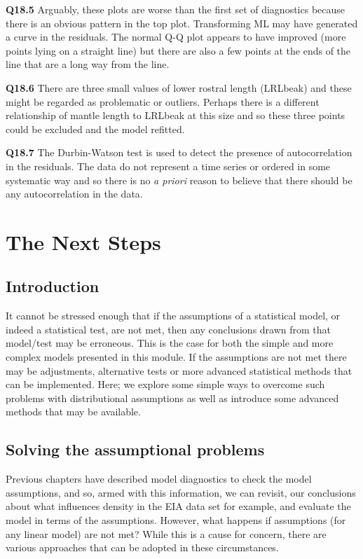 \documentclass[
  oneside]{krantz}
\begin{document}
\textbf{Q18.5} Arguably, these plots are worse than the first set of diagnostics because there
is an obvious pattern in the top plot. Transforming ML may have generated a curve
in the residuals. The normal Q-Q plot appears to have improved (more points lying
on a straight line) but there are also a few points at the ends of the line that
are a long way from the line.

\textbf{Q18.6} There are three small values of lower rostral length (LRLbeak) and these might
be regarded as problematic or outliers. Perhaps there is a different relationship
of mantle length to LRLbeak at this size and so these three points could be
excluded and the model refitted.

\textbf{Q18.7} The Durbin-Watson test is used to detect the presence of autocorrelation in the
residuals. The data do not represent a time series or ordered in some systematic
way and so there is no \emph{a priori} reason to believe that there should be
any autocorrelation in the data.

\hypertarget{nextsteps}{%
\chapter{The Next Steps}\label{nextsteps}}

\hypertarget{INTnext}{%
\section{Introduction}\label{INTnext}}

It cannot be stressed enough that if the assumptions of a statistical model, or indeed a statistical test, are not met, then any conclusions drawn from that model/test may be erroneous. This is the case for both the simple and more complex models presented in this module. If the assumptions are not met there may be adjustments, alternative tests or more advanced statistical methods that can be implemented. Here; we explore some simple ways to overcome such problems with distributional assumptions as well as introduce some advanced methods that may be available.

\hypertarget{solving-the-assumptional-problems}{%
\section{Solving the assumptional problems}\label{solving-the-assumptional-problems}}

Previous chapters have described model diagnostics to check the model assumptions, and so, armed with this information, we can revisit, our conclusions about what influences density in the EIA data set for example, and evaluate the model in terms of the assumptions. However, what happens if assumptions (for any linear model) are not met? While this is a cause for concern, there are various approaches that can be adopted in these circumstances.
\end{document}
